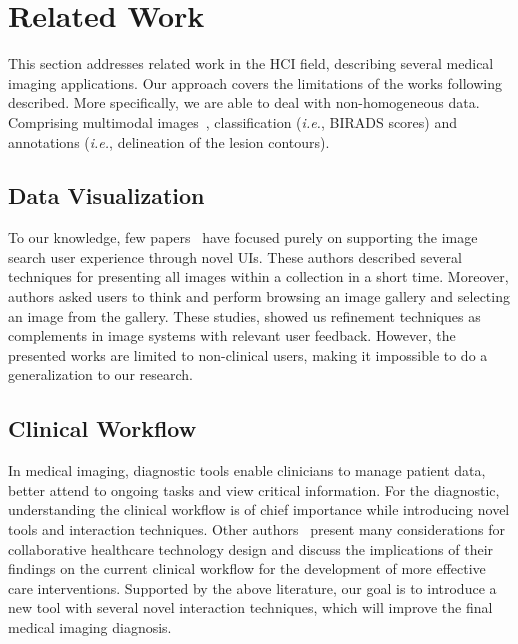 \section{Related Work}
\label{sec:sec002}

This section addresses related work in the HCI field, describing several medical imaging applications.
Our approach covers the limitations of the works following described.
More specifically, we are able to deal with non-homogeneous data.
Comprising multimodal images~\cite{Zhang_2018_CVPR}, classification ({\it i.e.}, BIRADS scores) and annotations ({\it i.e.}, delineation of the lesion contours).

\subsection{Data Visualization}

To our knowledge, few papers~\cite{10.1145/1133265.1133354, 10.1145/2909132.2909248, 10.1145/3206505.3206602} have focused purely on supporting the image search user experience through novel UIs.
These authors described several techniques for presenting all images within a collection in a short time.
Moreover, authors asked users to think and perform browsing an image gallery and selecting an image from the gallery.
These studies, showed us refinement techniques as complements in image systems with relevant user feedback.
However, the presented works are limited to non-clinical users, making it impossible to do a generalization to our research.


\subsection{Clinical Workflow}

In medical imaging, diagnostic tools enable clinicians to manage patient data, better attend to ongoing tasks and view critical information.
For the diagnostic, understanding the clinical workflow is of chief importance while introducing novel tools and interaction techniques.
Other authors~\cite{10.1145/2685553.2699332, 10.5555/2826165.2826187} present many considerations for collaborative healthcare technology design and discuss the implications of their findings on the current clinical workflow for the development of more effective care interventions.
Supported by the above literature, our goal is to introduce a new tool with several novel interaction techniques, which will improve the final medical imaging diagnosis.

